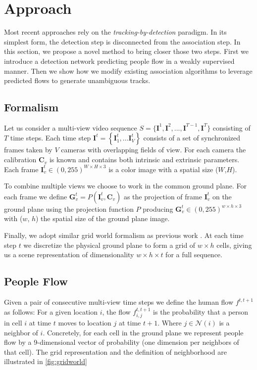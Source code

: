 \documentclass[10pt,twocolumn,letterpaper]{article}
\begin{document}
\section{Approach}\label{sec:approach}
 Most recent approaches rely on the \textit{tracking-by-detection} paradigm. 
In its simplest form, the detection step is disconnected from the association step.
In this section, we propose a novel method to bring closer those two steps. First we introduce a detection network predicting people flow in a weakly supervised manner. 
Then we show how we modify existing association algorithms to leverage predicted flows to generate unambiguous tracks. 


\subsection{Formalism}
\label{sec:formalism}

Let us consider a multi-view video sequence $S=\{\mathbf{I}^1, \mathbf{I}^2,  ..., \mathbf{I}^{T-1}, \mathbf{I}^T\}$ consisting of $T$ time steps.
Each time step $\mathbf{I}^t=\left\{\mathbf{I}_1^{t}, \ldots \mathbf{I}_V^{t}\right\}$ consists of a set of synchronized frames taken by $V$ cameras with overlapping fields of view.
For each camera the calibration $\mathbf{C}_{v}$ is known and contains both intrinsic and extrinsic parameters.
Each frame $\mathbf{I}_v^t \in(0,255)^{W \times H \times 3}$  is a color image with a spatial size ($W$,$H$).

To combine multiple views we choose to work in the common ground plane. For each frame we define $\mathbf{G}_v^t = P(\mathbf{I}_v^t, \mathbf{C}_{v})$ as the  projection of frame $\mathbf{I}_v^t$ 
on the ground plane using the projection function $P$ producing $\mathbf{G}_v^t \in(0,255)^{w \times h \times 3}$ with ($w$, $h$)  the spatial size of the ground plane image. 


Finally, we adopt similar grid world formalism as previous work \cite{Berclaz11}. At each time step $t$ we discretize the physical ground plane to form a grid of $w \times h$ cells, 
giving us a scene representation of dimensionality ${w \times h \times t}$ for a full sequence.



\subsection{People Flow}
\label{sec:peopleflow}

Given a pair of consecutive multi-view time steps we define the human flow $f^{t,t+1}$ as follows: For a given location $i$, the flow $f^{t,t+1}_{i,j}$ 
is the probability that a person in cell $i$ at time $t$ moves to location $j$ at time $t+1$. Where $j \in \mathcal{N}(i)$ is a neighbor of $i$. 
Concretely, for each cell in the ground plane we represent people flow by a 9-dimensional vector of probability (one dimension per neighbors of that cell). 
The grid representation and the definition  of neighborhood are illustrated in \cref{fig:gridworld}
\end{document}
